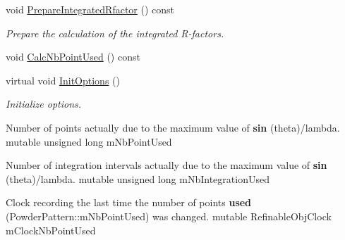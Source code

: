\begin{DoxyCompactItemize}
\mbox{\label{class_obj_cryst_1_1_powder_pattern_a11b29e7bf114a6b400bf8a7e6d8535f1}} 
void \mbox{\hyperlink{class_obj_cryst_1_1_powder_pattern_a11b29e7bf114a6b400bf8a7e6d8535f1}{Prepare\+Integrated\+Rfactor}} () const
\begin{DoxyCompactList}\small\item\em Prepare the calculation of the integrated R-\/factors. \end{DoxyCompactList}\item 
void \mbox{\hyperlink{class_obj_cryst_1_1_powder_pattern_a41398431ff5bc35f99d47224c3d4a6ec}{Calc\+Nb\+Point\+Used}} () const
\item 
\mbox{\label{class_obj_cryst_1_1_powder_pattern_ab61ff252df08374529a87e8b2d090f9f}} 
virtual void \mbox{\hyperlink{class_obj_cryst_1_1_powder_pattern_ab61ff252df08374529a87e8b2d090f9f}{Init\+Options}} ()
\begin{DoxyCompactList}\small\item\em Initialize options. \end{DoxyCompactList}\item 
\mbox{\label{class_obj_cryst_1_1_powder_pattern_aedb4fbac375e7a10db65b132475b5cdd}} 
Number of points actually due to the maximum value of {\bfseries sin} (theta)/lambda. mutable unsigned long m\+Nb\+Point\+Used
\item 
\mbox{\label{class_obj_cryst_1_1_powder_pattern_a18d1f983eb0af5777bd457c2e2e24ab1}} 
Number of integration intervals actually due to the maximum value of {\bfseries sin} (theta)/lambda. mutable unsigned long m\+Nb\+Integration\+Used
\item 
\mbox{\label{class_obj_cryst_1_1_powder_pattern_a12a0d5ac50069f760e7de43b41e5384a}} 
Clock recording the last time the number of points {\bfseries used} (Powder\+Pattern\+::m\+Nb\+Point\+Used) was changed. mutable Refinable\+Obj\+Clock m\+Clock\+Nb\+Point\+Used
\end{DoxyCompactItemize}
